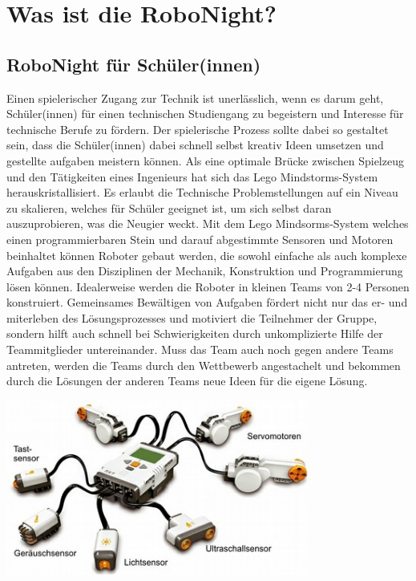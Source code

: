 \chapter{Was ist die RoboNight?}

\section{RoboNight für Schüler(innen)}
  Einen spielerischer Zugang zur Technik ist unerlässlich, wenn es darum geht, Schüler(innen) für einen technischen Studiengang zu begeistern und Interesse für technische Berufe zu fördern. Der spielerische Prozess sollte dabei so gestaltet sein, dass die Schüler(innen) dabei schnell selbst kreativ Ideen umsetzen und gestellte aufgaben meistern können. 
  \newline
  Als eine optimale Brücke zwischen Spielzeug und den Tätigkeiten eines Ingenieurs hat sich das Lego Mindstorms-System herauskristallisiert. Es erlaubt die Technische Problemstellungen auf ein Niveau zu skalieren, welches für Schüler geeignet ist, um sich selbst daran auszuprobieren, was die Neugier weckt. Mit dem Lego Mindsorms-System welches einen programmierbaren Stein und darauf abgestimmte Sensoren und Motoren beinhaltet können Roboter gebaut werden, die sowohl einfache als auch komplexe Aufgaben aus den Disziplinen der Mechanik, Konstruktion und Programmierung lösen können.
  \newline
  Idealerweise werden die Roboter in kleinen Teams von 2-4 Personen konstruiert. Gemeinsames Bewältigen von Aufgaben fördert nicht nur das er- und miterleben des Lösungsprozesses und motiviert die Teilnehmer der Gruppe, sondern hilft auch schnell bei Schwierigkeiten durch unkomplizierte Hilfe der Teammitglieder untereinander.
  \newline
  Muss das Team auch noch gegen andere Teams antreten, werden die Teams durch den Wettbewerb angestachelt und bekommen durch die Lösungen der anderen Teams neue Ideen für die eigene Lösung.
  
  \begin{capfigure}
	\includegraphics[width=10cm]{images/mindstorms.jpg}
  \end{capfigure}

